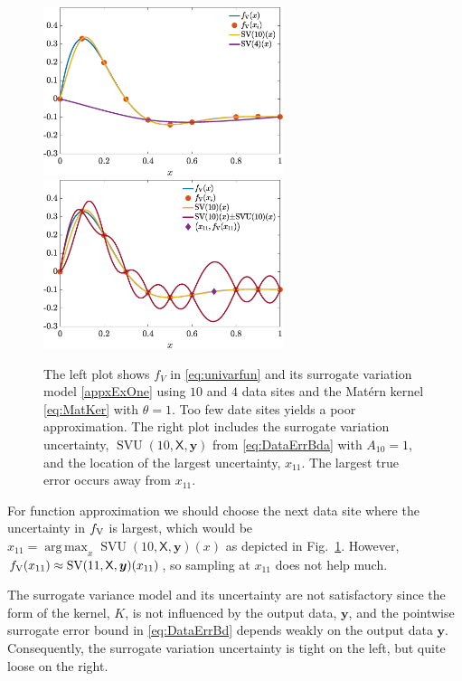 \documentclass[11pt]{NSFamsart}
\DeclareMathOperator*{\argmax}{arg\,max}
\DeclareMathOperator{\SVAR}{SV} %
\DeclareMathOperator{\SVARERR}{SVU} %
\newcommand{\VAR}{\textup{V}}
\newcommand{\mX}{\mathsf{X}}
\newcommand{\by}{{\boldsymbol{y}}}
\begin{document}
\begin{figure}[ht]
\centering
\includegraphics[width = 7cm]{ProgramsImages/fandDataAndAppxSmall.eps} \qquad \qquad
\includegraphics[width = 7cm]{ProgramsImages/fandDataAndAppxAndRMSPE.eps}
\caption{The left plot shows $f_V$ in \eqref{eq:univarfun} and its surrogate variation model \eqref{appxExOne} using $10$ and $4$ data sites and the Mat\'ern kernel \eqref{eq:MatKer} with $\theta = 1$. Too few date sites yields a poor approximation. The right plot includes the surrogate variation uncertainty, $\SVARERR(10,\mX,\by)$ from \eqref{eq:DataErrBda} with $A_{10} =1$, and the location of the largest uncertainty, $x_{11}$. The largest true error occurs away from $x_{11}$.}
\label{fig:sampleFun}
\end{figure}

For function approximation we should choose the next data site where the uncertainty in $f_{\VAR}$ is largest, which would be $x_{11} = \argmax_x \SVARERR(10,\mX,\by)(x)$ as depicted in Fig.\ \ref{fig:sampleFun}. However, $f_{\VAR}(x_{11}) \approx \SVAR(11,\mX,\by)(x_{11})$, so sampling at $x_{11}$ does not help much.

The surrogate variance model and its uncertainty are not satisfactory since the form of the kernel, $K$, is not influenced by the output data, $\by$, and the pointwise surrogate error bound in \eqref{eq:DataErrBd} depends weakly on the output data $\by$. Consequently, the surrogate variation uncertainty is tight on the left, but quite loose on the right. 
\end{document}
